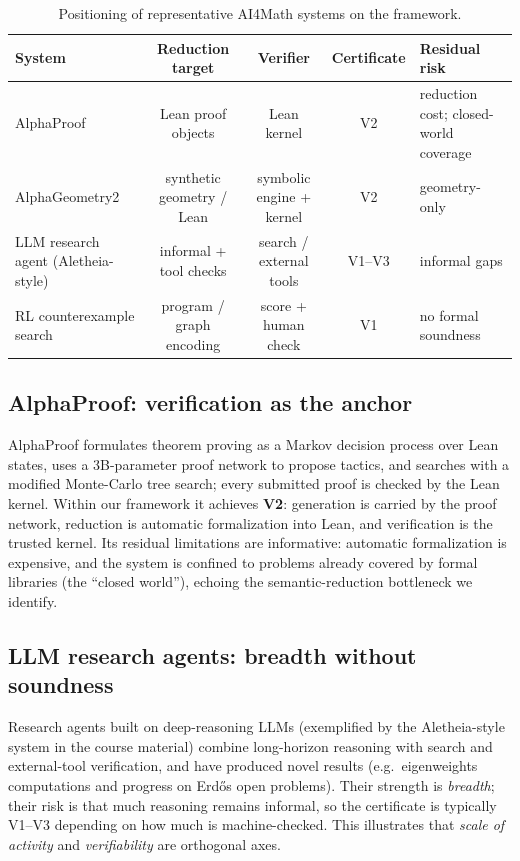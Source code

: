 \documentclass[11pt,a4paper]{article}
\theoremstyle{definition}
\theoremstyle{plain}
\begin{document}
\begin{table}[t]
\centering
\caption{Positioning of representative AI4Math systems on the framework.}
\label{tab:systems}
\small
\begin{tabular}{@{}l c c c l@{}}
\toprule
\textbf{System} & \textbf{Reduction target} & \textbf{Verifier} & \textbf{Certificate} & \textbf{Residual risk}\\
\midrule
AlphaProof \cite{hubert2026} & Lean proof objects & Lean kernel & V2 & reduction cost; closed-world
coverage\\
AlphaGeometry2 \cite{chervonyi2025} & synthetic geometry / Lean & symbolic engine + kernel & V2 & geometry-only\\
LLM research agent (Aletheia-style) \cite{romera2024} & informal + tool checks & search / external tools & V1--V3 & informal
gaps\\
RL counterexample search \cite{wagner2021} & program / graph encoding & score + human check & V1 & no formal
soundness\\
\bottomrule
\end{tabular}
\end{table}

\subsection{AlphaProof: verification as the anchor}
\label{sec:case-alphaproof}

AlphaProof \cite{hubert2026} formulates theorem proving as a Markov decision process over Lean states,
uses a 3B-parameter proof network to propose tactics, and searches with a modified Monte-Carlo tree
search; every submitted proof is checked by the Lean kernel. Within our framework it achieves
\textbf{V2}: generation is carried by the proof network, reduction is automatic formalization into Lean,
and verification is the trusted kernel. Its residual limitations are informative: automatic
formalization is expensive, and the system is confined to problems already covered by formal libraries
(the ``closed world''), echoing the semantic-reduction bottleneck we identify.

\subsection{LLM research agents: breadth without soundness}
\label{sec:case-agent}

Research agents built on deep-reasoning LLMs (exemplified by the Aletheia-style system in the course
material) combine long-horizon reasoning with search and external-tool verification, and have produced
novel results (e.g.\ eigenweights computations and progress on Erd\H{o}s open problems). Their strength
is \emph{breadth}; their risk is that much reasoning remains informal, so the certificate is typically
V1--V3 depending on how much is machine-checked. This illustrates that \emph{scale of activity} and
\emph{verifiability} are orthogonal axes.
\end{document}
